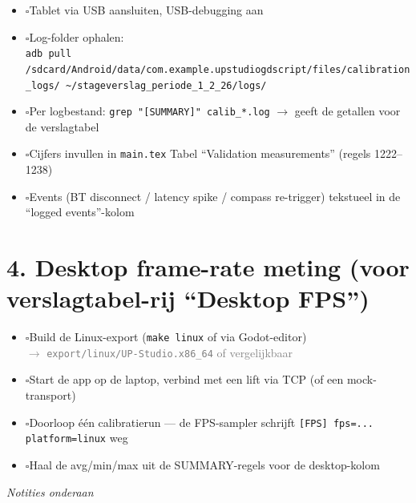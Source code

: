 \documentclass[a4paper,11pt]{article}
\newcommand{\cbox}{$\square$\hspace{0.5em}}
\newcommand{\fillspace}[1][3em]{\underline{\hspace{#1}}}
\begin{document}
\begin{itemize}
    \item \cbox Tablet via USB aansluiten, USB-debugging aan
    \item \cbox Log-folder ophalen:\\
        \texttt{\small adb pull /sdcard/Android/data/com.example.upstudiogdscript/files/calibration\_logs/ \~{}/stageverslag\_periode\_1\_2\_26/logs/}
    \item \cbox Per logbestand: \texttt{grep "{[}SUMMARY{]}" calib\_*.log} $\rightarrow$ geeft de getallen voor de verslagtabel
    \item \cbox Cijfers invullen in \texttt{main.tex} Tabel ``Validation measurements'' (regels 1222--1238)
    \item \cbox Events (BT disconnect / latency spike / compass re-trigger) tekstueel in de ``logged events''-kolom
\end{itemize}

\vspace{0.5em}

\section*{4. Desktop frame-rate meting (voor verslagtabel-rij ``Desktop FPS'')}

\begin{itemize}
    \item \cbox Build de Linux-export (\texttt{make linux} of via Godot-editor)\\
          \textcolor{gray}{\small $\rightarrow$ \texttt{export/linux/UP-Studio.x86\_64} of vergelijkbaar}
    \item \cbox Start de app op de laptop, verbind met een lift via TCP (of een mock-transport)
    \item \cbox Doorloop één calibratierun --- de FPS-sampler schrijft \texttt{[FPS] fps=... platform=linux} weg
    \item \cbox Haal de avg/min/max uit de SUMMARY-regels voor de desktop-kolom
\end{itemize}

\vfill
\begin{center}
    \textit{Notities onderaan}\\[0.5em]
    \fillspace[\linewidth]\\[1em]
    \fillspace[\linewidth]\\[1em]
    \fillspace[\linewidth]
\end{center}
\end{document}
